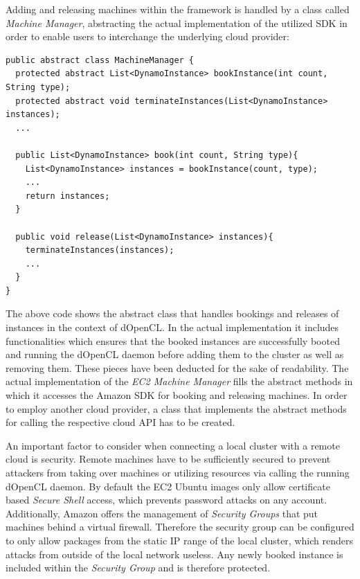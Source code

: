 Adding and releasing machines within the framework is handled by a class called \textit{Machine Manager}, abstracting the actual implementation of the utilized SDK in order to enable users to interchange the underlying cloud provider:


\begin{lstlisting}[caption=Machine Manager Abstract Implementation,captionpos=b]
public abstract class MachineManager {
  protected abstract List<DynamoInstance> bookInstance(int count, String type);
  protected abstract void terminateInstances(List<DynamoInstance> instances);
  ...

  public List<DynamoInstance> book(int count, String type){
    List<DynamoInstance> instances = bookInstance(count, type);
    ...
    return instances;
  }

  public void release(List<DynamoInstance> instances){
    terminateInstances(instances);
    ...
  }
}
\end{lstlisting}

The above code shows the abstract class that handles bookings and releases of instances in the context of dOpenCL. In the actual implementation it includes functionalities which ensures that the booked instances are successfully booted and running the dOpenCL daemon before adding them to the cluster as well as removing them. These pieces have been deducted for the sake of readability. The actual implementation of the \textit{EC2 Machine Manager} fills the abstract methods in which it accesses the Amazon SDK for booking and releasing machines. In order to employ another cloud provider, a class that implements the abstract methods for calling the respective cloud API has to be created.

An important factor to consider when connecting a local cluster with a remote cloud is security. Remote machines have to be sufficiently secured to prevent attackers from taking over machines or utilizing resources via calling the running dOpenCL daemon. By default the EC2 Ubuntu images only allow certificate based \textit{Secure Shell} access, which prevents password attacks on any account. Additionally, Amazon offers the management of \textit{Security Groups} that put machines behind a virtual firewall. Therefore the security group can be configured to only allow packages from the static IP range of the local cluster, which renders attacks from outside of the local network useless. Any newly booked instance is included within the \textit{Security Group} and is therefore protected.

